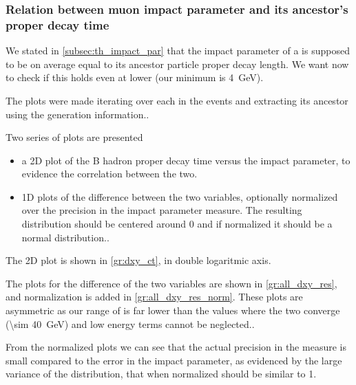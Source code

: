 \subsubsection{Relation between muon impact parameter and its ancestor's proper decay time}

We stated in \autoref{subsec:th_impact_par} that the impact parameter of a \Pgm is supposed to be on average equal to its ancestor particle proper decay length.
We want now to check if this holds even at lower \pt (our minimum \pt is \SI{4}{\GeV}).

The plots were made iterating over each \Pgm in the events and extracting its ancestor using the generation information..

Two series of plots are presented
\begin{itemize}
	\item a 2D plot of the B hadron proper decay time versus the \Pgm impact parameter, to evidence the correlation between the two.
	\item 1D plots of the difference between the two variables, optionally normalized over the precision in the impact parameter measure. The resulting distribution should be centered around 0 and if normalized it should be a normal distribution..
\end{itemize}

The 2D plot is shown in \autoref{gr:dxy_ct}, in double logaritmic axis.


The plots for the difference of the two variables are shown in \autoref{gr:all_dxy_res}, and normalization is added in \autoref{gr:all_dxy_res_norm}.
These plots are asymmetric as our range of \pt is far lower than the values where the two converge (\SI{\sim 40}{\GeV}) and low energy terms cannot be neglected..



From the normalized plots we can see that the actual precision in the measure is small compared to the error in the impact parameter, as evidenced by the large variance of the distribution, that when normalized should be similar to 1.
